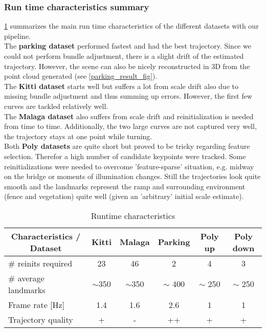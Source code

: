 \subsubsection{Run time characteristics summary}
\cref{runtime_table} summarizes the main run time characteristics of the different datasets with our pipeline.\\

The \textbf{parking dataset} performed fastest and had the best trajectory. Since we could not perform bundle adjustment, there is a slight drift of the estimated trajectory. However, the scene can also be nicely reconstructed in 3D from the point cloud generated (see \cref{parking_result_fig}).\\

The \textbf{Kitti dataset} starts well but suffers a lot from scale drift also due to missing bundle adjustment and thus summing up errors. However, the first few curves are tackled relatively well.\\

The \textbf{Malaga dataset} also suffers from scale drift and reinitialization is needed from time to time. Additionally, the two large curves are not captured very well, the trajectory stays at one point while turning.\\

Both \textbf{Poly datasets} are quite short but proved to be tricky regarding feature selection. Therefor a high number of candidate keypoints were tracked. Some reinitializations were needed to overcome 'feature-sparse' situation, e.g. midway on the bridge or moments of illumination changes. Still the trajectories look quite smooth and the landmarks represent the ramp and surrounding environment (fence and vegetation) quite well (given an 'arbitrary' initial scale estimate).

\begin{table}[h!!]
	\centering
	\begin{tabular}{|l|c|c|c|c|c|}
	\hline
	\multicolumn{1}{|c|}{\textbf{Characteristics / Dataset}} & \textbf{Kitti} & \textbf{Malaga} & \textbf{Parking} & \textbf{Poly up} & \textbf{Poly down} \\ \hline
	\# reinits required                                      & 23             &  46               & 2                & 4 & 3  \\ \hline
	\# average landmarks                                     & $\sim$350      &  $\sim$350         & $\sim$ 400       & $\sim$ 250 & $\sim$ 250 \\ \hline
	Frame rate {[}Hz{]}                                      & 1.4            &  1.6               & 2.6              & 1 & 1 \\ \hline
	Trajectory quality                                       & +              &  -               & ++               & + & + \\ \hline
	\end{tabular}
	\caption{Runtime characteristics}
	\label{runtime_table}
\end{table}

